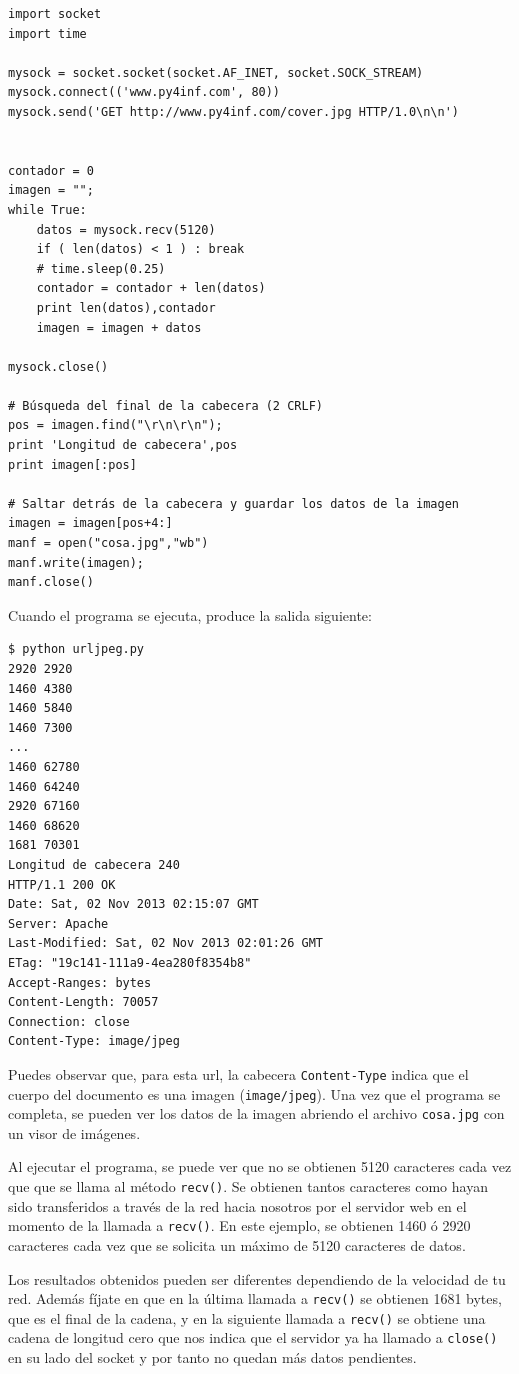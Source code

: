\beforeverb
\begin{verbatim}
import socket
import time

mysock = socket.socket(socket.AF_INET, socket.SOCK_STREAM)
mysock.connect(('www.py4inf.com', 80))
mysock.send('GET http://www.py4inf.com/cover.jpg HTTP/1.0\n\n')


contador = 0
imagen = "";
while True:
    datos = mysock.recv(5120)
    if ( len(datos) < 1 ) : break
    # time.sleep(0.25)
    contador = contador + len(datos)
    print len(datos),contador
    imagen = imagen + datos

mysock.close()

# Búsqueda del final de la cabecera (2 CRLF)
pos = imagen.find("\r\n\r\n");
print 'Longitud de cabecera',pos
print imagen[:pos]

# Saltar detrás de la cabecera y guardar los datos de la imagen
imagen = imagen[pos+4:]
manf = open("cosa.jpg","wb")
manf.write(imagen);
manf.close()
\end{verbatim}
\afterverb
%
Cuando el programa se ejecuta, produce la salida siguiente:

\beforeverb
\begin{verbatim}
$ python urljpeg.py 
2920 2920
1460 4380
1460 5840
1460 7300
...
1460 62780
1460 64240
2920 67160
1460 68620
1681 70301
Longitud de cabecera 240
HTTP/1.1 200 OK
Date: Sat, 02 Nov 2013 02:15:07 GMT
Server: Apache
Last-Modified: Sat, 02 Nov 2013 02:01:26 GMT
ETag: "19c141-111a9-4ea280f8354b8"
Accept-Ranges: bytes
Content-Length: 70057
Connection: close
Content-Type: image/jpeg
\end{verbatim}
\afterverb
%
Puedes observar que, para esta url, la
cabecera {\tt Content-Type} indica que el
cuerpo del documento es una imagen ({\tt image/jpeg}).
Una vez que el programa se completa, se pueden ver los datos de la imagen abriendo
el archivo {\tt cosa.jpg} con un visor de imágenes.

Al ejecutar el programa, se puede ver que no se obtienen 5120 caracteres
cada vez que que se llama al método {\tt recv()}.
Se obtienen tantos caracteres como hayan sido transferidos a través de la red
hacia nosotros por el servidor web en el momento de la llamada a {\tt recv()}.
En este ejemplo, se obtienen 1460 ó 2920 caracteres cada vez que
se solicita un máximo de 5120 caracteres de datos.

Los resultados obtenidos pueden ser diferentes dependiendo de la velocidad de tu red. Además
fíjate en que en la última llamada a {\tt recv()} se obtienen 1681 bytes, que es el final
de la cadena, y en la siguiente llamada a {\tt recv()} se obtiene una cadena de
longitud cero que nos indica que el servidor ya ha llamado a {\tt close()} en su lado
del socket y por tanto no quedan más datos pendientes.

